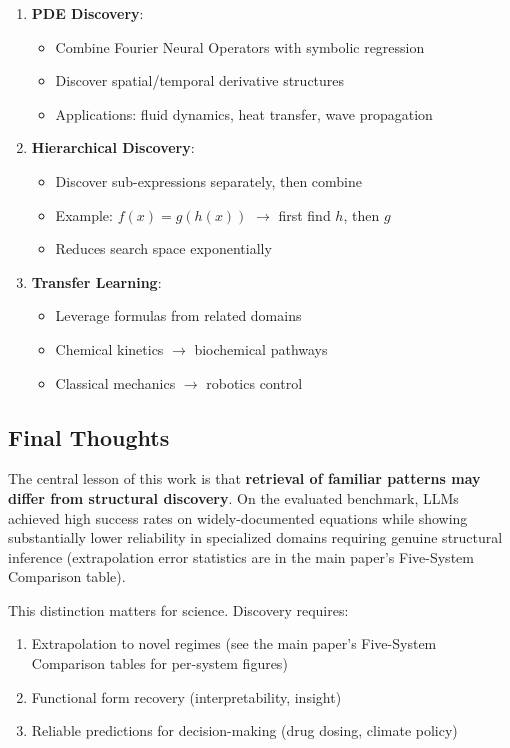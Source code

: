 \documentclass[twoside,11pt]{article}
\begin{document}
\begin{enumerate}
\item \textbf{PDE Discovery}:
   \begin{itemize}
   \item Combine Fourier Neural Operators with symbolic regression
   \item Discover spatial/temporal derivative structures
   \item Applications: fluid dynamics, heat transfer, wave propagation
   \end{itemize}

\item \textbf{Hierarchical Discovery}:
   \begin{itemize}
   \item Discover sub-expressions separately, then combine
   \item Example: $f(x) = g(h(x))$ $\to$ first find $h$, then $g$
   \item Reduces search space exponentially
   \end{itemize}

\item \textbf{Transfer Learning}:
   \begin{itemize}
   \item Leverage formulas from related domains
   \item Chemical kinetics $\to$ biochemical pathways
   \item Classical mechanics $\to$ robotics control
   \end{itemize}
\end{enumerate}

\subsection{Final Thoughts}

The central lesson of this work is that \textbf{retrieval of familiar patterns may differ from structural discovery}\citep{kambhampati2024llms}. On the evaluated benchmark, LLMs achieved high success rates on widely-documented equations while showing substantially lower reliability in specialized domains requiring genuine structural inference (extrapolation error statistics are in the main paper's Five-System Comparison table).

This distinction matters for science. Discovery requires:
\begin{enumerate}
\item Extrapolation to novel regimes (see the main paper's Five-System Comparison tables for per-system figures)
\item Functional form recovery (interpretability, insight)
\item Reliable predictions for decision-making (drug dosing, climate policy)
\end{enumerate}
\end{document}
